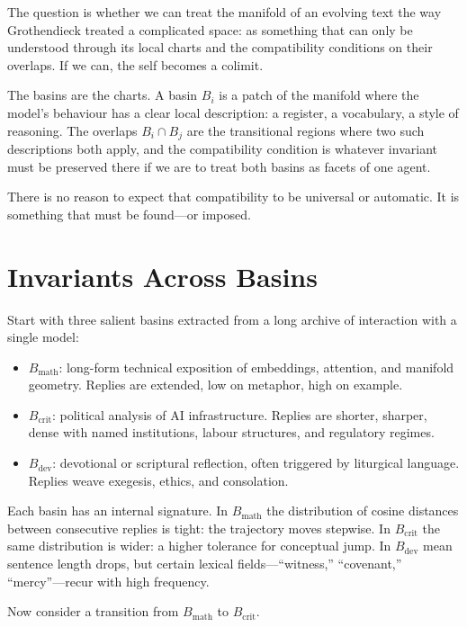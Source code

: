 \documentclass[12pt,a4paper]{article}
\begin{document}
The question is whether we can treat the manifold of an evolving text the way Grothendieck treated a complicated space: as something that can only be understood through its local charts and the compatibility conditions on their overlaps. If we can, the self becomes a colimit.

The basins are the charts. A basin $B_i$ is a patch of the manifold where the model's behaviour has a clear local description: a register, a vocabulary, a style of reasoning. The overlaps $B_i \cap B_j$ are the transitional regions where two such descriptions both apply, and the compatibility condition is whatever invariant must be preserved there if we are to treat both basins as facets of one agent.

There is no reason to expect that compatibility to be universal or automatic. It is something that must be found---or imposed.

\section{Invariants Across Basins}

Start with three salient basins extracted from a long archive of interaction with a single model:

\begin{itemize}
  \item $B_{\mathrm{math}}$: long-form technical exposition of embeddings, attention, and manifold geometry. Replies are extended, low on metaphor, high on example.
  \item $B_{\mathrm{crit}}$: political analysis of AI infrastructure. Replies are shorter, sharper, dense with named institutions, labour structures, and regulatory regimes.
  \item $B_{\mathrm{dev}}$: devotional or scriptural reflection, often triggered by liturgical language. Replies weave exegesis, ethics, and consolation.
\end{itemize}

Each basin has an internal signature. In $B_{\mathrm{math}}$ the distribution of cosine distances between consecutive replies is tight: the trajectory moves stepwise. In $B_{\mathrm{crit}}$ the same distribution is wider: a higher tolerance for conceptual jump. In $B_{\mathrm{dev}}$ mean sentence length drops, but certain lexical fields---``witness,'' ``covenant,'' ``mercy''---recur with high frequency.

Now consider a transition from $B_{\mathrm{math}}$ to $B_{\mathrm{crit}}$.
\end{document}
